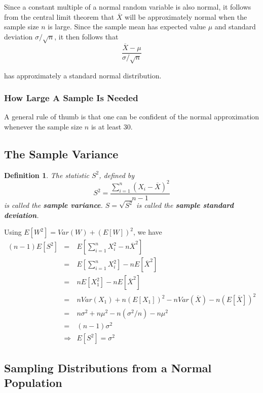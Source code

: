 \documentclass[12pt]{article}
\newtheorem{definition}[theorem]{Definition}
\begin{document}
Since a constant multiple of a normal random variable is also normal, it follows from the central limit theorem that $\overline{X}$ will be approximately normal when the sample size $n$ is large. Since the sample mean has expected value $\mu$ and standard deviation $\sigma / \sqrt{n}$, it then follows that
\begin{equation*}
  \frac {\overline{X} - \mu}{\sigma / \sqrt{n}}
\end{equation*}

has approximately a standard normal distribution.

\subsubsection{How Large A Sample Is Needed}

A general rule of thumb is that one can be confident of the normal approximation whenever the sample size $n$ is at least 30.

\subsection{The Sample Variance}

\begin{definition}
  The statistic $S^2$, defined by
  \begin{equation*}
    S^2 = \frac {\sum_{i=1}^n (X_i - \overline{X})^2}{n-1}
  \end{equation*}
  is called the \textbf{sample variance}. $S = \sqrt{S^2}$ is called the \textbf{sample standard deviation}.
\end{definition}

Using $E[W^2] = Var(W) + (E[W])^2$, we have
\begin{eqnarray*}
  (n-1)E[S^2]
  &=& E \left[ \sum_{i=1}^n X_i^2 - n \overline{X}^2 \right] \\
  &=& E \left[ \sum_{i=1}^n X_i^2 \right] - n E[\overline{X}^2] \\
  &=& n E[X_1^2] - n E[\overline{X}^2] \\
  &=& n Var(X_1) + n (E[X_1])^2 - n Var(\overline{X})
  - n (E[\overline{X}])^2 \\
  &=& n \sigma^2 + n \mu^2 - n (\sigma^2 / n) - n \mu^2 \\
  &=& (n-1) \sigma^2 \\
  &\Rightarrow& E[S^2] = \sigma^2
\end{eqnarray*}

\subsection{Sampling Distributions from a Normal Population}
\end{document}
